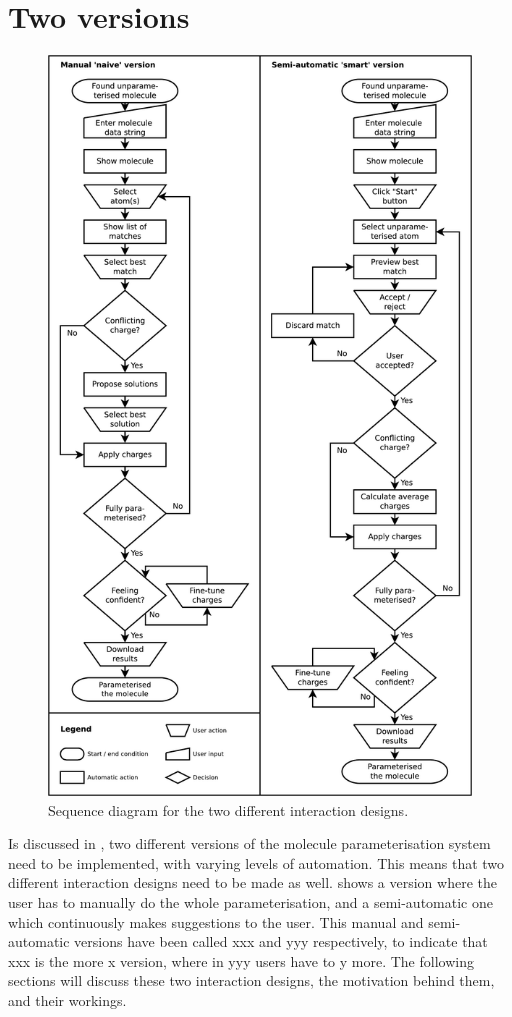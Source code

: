 \section{Two versions}

\begin{figure}[h!]
\begin{center}
\includegraphics[width=.9\textwidth]{img/complete_id.pdf}
\caption{Sequence diagram for the two different interaction designs.}
\vspace{-2cm}
\end{center}
\end{figure}

Is discussed in , two different versions of the molecule parameterisation system need to be implemented, with varying levels of automation. This means that two different interaction designs need to be made as well.  shows a version where the user has to manually do the whole parameterisation, and a semi-automatic one which continuously makes suggestions to the user. This manual and semi-automatic versions have been called xxx and yyy respectively, to indicate that xxx is the more x version, where in yyy users have to y more. The following sections will discuss these two interaction designs, the motivation behind them, and their workings.


